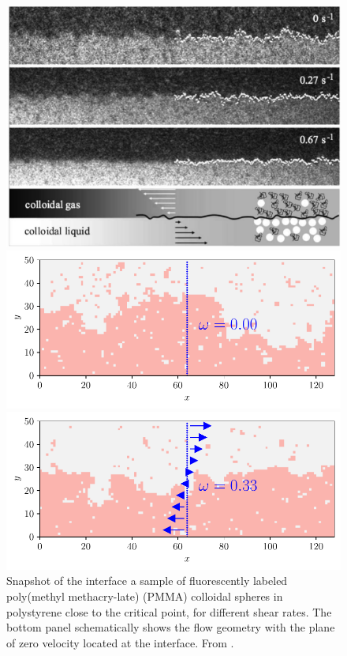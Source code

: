 \begin{figure}
\centering
\includegraphics[width=0.7\linewidth]{int-dyn/derks.png}
\caption{Snapshot of the interface a sample of fluorescently labeled poly(methyl methacry-late) (PMMA) colloidal spheres in polystyrene close to the critical point, for different shear rates. The bottom panel schematically shows the flow geometry with the plane of zero velocity located at the interface. From \cite{derks_suppression_2006}. }
\label{snap-derks-shear}
\vspace*{\floatsep}
\begin{minipage}[t]{0.5\linewidth}
\includegraphics[width=\linewidth]{intro/cis-ising-f-000.pdf}
\end{minipage}%
\begin{minipage}[t]{0.5\linewidth}
\includegraphics[width=\linewidth]{intro/cis-ising-f-033.pdf}

\end{minipage}
\end{figure}
